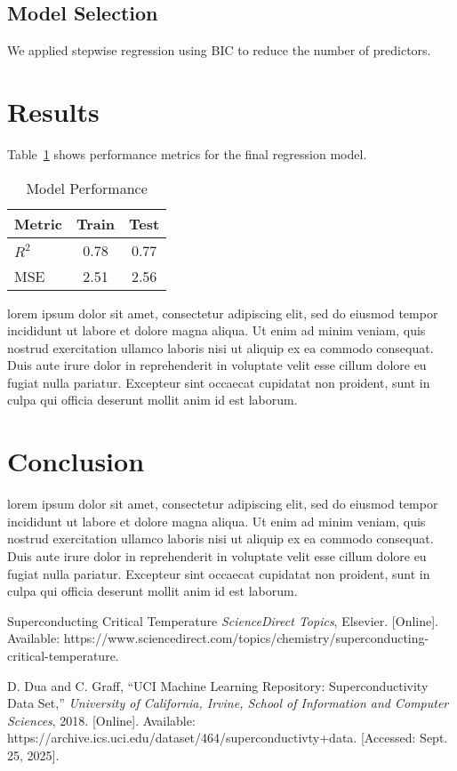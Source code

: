 \documentclass[conference]{IEEEtran}
\begin{document}
\subsection{Model Selection}
We applied stepwise regression using BIC to reduce the number of predictors.

\section{Results}
Table~\ref{tab:results} shows performance metrics for the final regression model.

\begin{table}[htbp]
  \caption{Model Performance}
  \centering
  \begin{tabular}{lcc}
    \toprule
    Metric & Train & Test \\
    \midrule
    $R^2$       & 0.78 & 0.77 \\
    MSE         & 2.51 & 2.56 \\
    \bottomrule
  \end{tabular}
  \label{tab:results}
\end{table}

lorem ipsum dolor sit amet, consectetur adipiscing elit, sed do eiusmod tempor incididunt ut labore et dolore magna aliqua. Ut enim ad minim veniam, quis nostrud exercitation ullamco laboris nisi ut aliquip ex ea commodo consequat. Duis aute irure dolor in reprehenderit in voluptate velit esse cillum dolore eu fugiat nulla pariatur. Excepteur sint occaecat cupidatat non proident, sunt in culpa qui officia deserunt mollit anim id est laborum.
\section{Conclusion}
lorem ipsum dolor sit amet, consectetur adipiscing elit, sed do eiusmod tempor incididunt ut labore et dolore magna aliqua. Ut enim ad minim veniam, quis nostrud exercitation ullamco laboris nisi ut aliquip ex ea commodo consequat. Duis aute irure dolor in reprehenderit in voluptate velit esse cillum dolore eu fugiat nulla pariatur. Excepteur sint occaecat cupidatat non proident, sunt in culpa qui officia deserunt mollit anim id est laborum.
\begin{thebibliography}{00}

Superconducting Critical Temperature \emph{ScienceDirect Topics}, Elsevier. [Online]. 
Available: https://www.sciencedirect.com/topics/chemistry/superconducting-critical-temperature. 

D. Dua and C. Graff, ``UCI Machine Learning Repository: Superconductivity Data Set,'' 
\emph{University of California, Irvine, School of Information and Computer Sciences}, 2018. 
[Online]. Available: https://archive.ics.uci.edu/dataset/464/superconductivty+data. 
[Accessed: Sept. 25, 2025].

\end{thebibliography}
\end{document}
